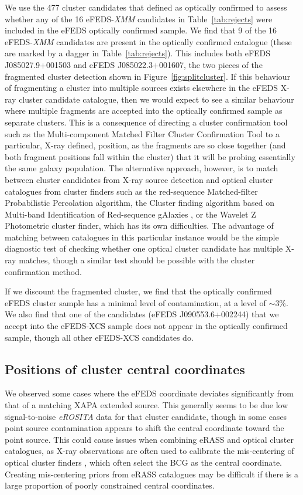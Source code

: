 \documentclass[fleqn,usenatbib]{mnras}
\begin{document}
We use the 477 cluster candidates that \cite{efedsclusteropticalcat} defined as optically confirmed to assess whether any of the 16 eFEDS-{\em XMM} candidates in Table~\ref{tab:rejects} were included in the eFEDS optically confirmed sample. We find that 9 of the 16 eFEDS-{\em XMM} candidates are present in the optically confirmed catalogue (these are marked by a dagger in Table~\ref{tab:rejects}).  This includes both eFEDS J085027.9+001503 and eFEDS J085022.3+001607, the two pieces of the fragmented cluster detection shown in Figure~\ref{fig:splitcluster}. If this behaviour of fragmenting a cluster into multiple sources exists elsewhere in the eFEDS X-ray cluster candidate catalogue, then we would expect to see a similar behaviour where multiple fragments are accepted into the optically confirmed sample as separate clusters. This is a consequence of directing a cluster confirmation tool such as the Multi-component Matched Filter Cluster Confirmation Tool \citep[MCMF,][]{MCMF} to a particular, X-ray defined, position, as the fragments are so close together (and both fragment positions fall within the cluster) that it will be probing essentially the same galaxy population. The alternative approach, however, is to match between cluster candidates from X-ray source detection and optical cluster catalogues from cluster finders such as the red-sequence Matched-filter Probabilistic Percolation \citep[redMaPPer,][]{redMaPPer} algorithm, the Cluster finding algorithm based on Multi-band Identification of Red-sequence gAlaxies \citep[CAMIRA,][]{camira}, or the Wavelet Z Photometric \citep[WaZP,][]{WaZP} cluster finder, which has its own difficulties. The advantage of matching between catalogues in this particular instance would be the simple diagnostic test of checking whether one optical cluster candidate has multiple X-ray matches, though a similar test should be possible with the cluster confirmation method. 

If we discount the fragmented cluster, we find that the optically confirmed eFEDS cluster sample has a minimal level of contamination, at a level of ${\sim}$3\%. We also find that one of the candidates (eFEDS J090553.6+002244) that we accept into the eFEDS-XCS sample does not appear in the optically confirmed sample, though all other eFEDS-XCS candidates do. 

\subsection{Positions of cluster central coordinates}
We observed some cases where the eFEDS coordinate deviates significantly from that of a matching XAPA extended source. This generally seems to be due low signal-to-noise {\em eROSITA} data for that cluster candidate, though in some cases point source contamination appears to shift the central coordinate toward the point source. This could cause issues when combining eRASS and optical cluster catalogues, as X-ray observations are often used to calibrate the mis-centering of optical cluster finders \citep[][]{desmiscentering}, which often select the BCG as the central coordinate. Creating mis-centering priors from eRASS catalogues may be difficult if there is a large proportion of poorly constrained central coordinates.
\end{document}
